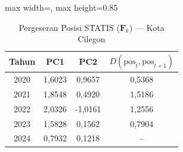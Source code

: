\begin{table}[H]
\centering
\caption{Pergeseran Posisi STATIS ($\mathbf{F}_k$) --- Kota Cilegon} \label{tab:app2jarak_statis_skor_kota_cilegon}
\begin{adjustbox}{max width=\textwidth, max height=0.85\textheight}
\begin{tabular}{|c|c|c|c|}
\hline
\textbf{Tahun} & \textbf{PC1} & \textbf{PC2} & \textbf{$D(\text{pos}_t, \text{pos}_{t+1})$} \\
\hline
2020 & 1,6023 & 0,9657 & 0,5368 \\
2021 & 1,8548 & 0,4920 & 1,5186 \\
2022 & 2,0326 & -1,0161 & 1,2556 \\
2023 & 1,5828 & 0,1562 & 0,7904 \\
2024 & 0,7932 & 0,1218 & -- \\
\hline
\end{tabular}
\end{adjustbox}
\end{table}